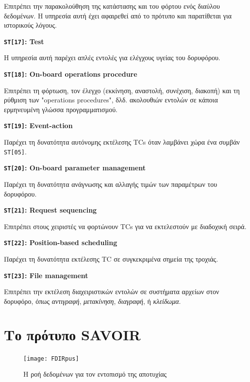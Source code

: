 \documentclass[a4paper,nobib]{tufte-book}
\begin{document}
\begin{compactitem}
		Επιτρέπει την παρακολούθηση της κατάστασης και του φόρτου ενός διαύλου δεδομένων. Η υπηρεσία αυτή έχει αφαιρεθεί από το πρότυπο και παρατίθεται για ιστορικούς λόγους.
		
		\item \textbf{\texttt{ST[17]}: Test}
		
		Η υπηρεσία αυτή παρέχει απλές εντολές για ελέγχους υγείας του δορυφόρου.
		
		\item \textbf{\texttt{ST[18]}: On-board operations procedure}
		
		Επιτρέπει τη φόρτωση, τον έλεγχο (εκκίνηση, αναστολή, συνέχιση, διακοπή) και τη ρύθμιση των "operations procedures", δλδ. ακολουθιών εντολών σε κάποια ερμηνευμένη γλώσσα προγραμματισμού.
		
		\item \textbf{\texttt{ST[19]}: Event-action}
		
		Παρέχει τη δυνατότητα αυτόνομης εκτέλεσης \acp{TC} όταν λαμβάνει χώρα ένα συμβάν \texttt{ST[05]}.
		
		\item \textbf{\texttt{ST[20]}: On-board parameter management}
		
		Παρέχει τη δυνατότητα ανάγνωσης και αλλαγής τιμών των παραμέτρων του δορυφόρου.
		
		\item \textbf{\texttt{ST[21]}: Request sequencing}
		
		Επιτρέπει στους χειριστές να φορτώνουν \acp{TC} για να εκτελεστούν με διαδοχική σειρά.
		
		\item \textbf{\texttt{ST[22]}: Position-based scheduling}
		
		Παρέχει τη δυνατότητα εκτέλεσης \ac{TC} σε συγκεκριμένα σημεία της τροχιάς.
		
		\item \textbf{\texttt{ST[23]}: File management}
		
		Επιτρέπει την εκτέλεση διαχειριστικών εντολών σε συστήματα αρχείων στον δορυφόρο, όπως \emph{αντιγραφή}, \emph{μετακίνηση}, \emph{διαγραφή}, ή \emph{κλείδωμα}.
\end{compactitem}

\section{Το πρότυπο SAVOIR}

\begin{figure}[h]
	\texttt{[image: FDIRpus]}
	\caption{Η ροή δεδομένων για τον εντοπισμό της αποτυχίας}
\end{figure}
\end{document}
